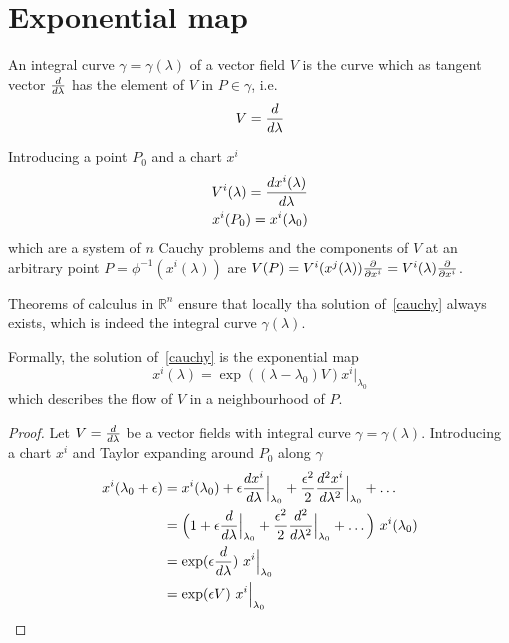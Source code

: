 \section{Exponential map}

    An integral curve $\gamma = \gamma(\lambda)$ of a vector field $V$ is the curve which as tangent vector $\frac{d}{d\lambda}$ has the element of $V$ in $P \in \gamma$, i.e. 
    \begin{equation*}
        V = \frac{d}{d\lambda}
    \end{equation*}

    Introducing a point $P_0$ and a chart $x^i$
    \begin{equation} \label{cauchy}
        \begin{split}
            V^i(\lambda) = \frac{dx^i(\lambda)}{d\lambda} \\
            x^i(P_0) = x^i(\lambda_0)
        \end{split}
    \end{equation}
    which are a system of $n$ Cauchy problems and the components of $V$ at an arbitrary point $ P = \phi^{-1}(x^i(\lambda))$ are $V(P) = V^i(x^j(\lambda)) \frac{\partial}{\partial x^i} = V^i(\lambda) \frac{\partial}{\partial x^i}$. 
    
    Theorems of calculus in $\mathbb R^n$ ensure that locally tha solution of~\eqref{cauchy} always exists, which is indeed the integral curve $\gamma(\lambda)$.

    Formally, the solution of~\eqref{cauchy} is the exponential map
    \begin{equation*}
        x^i(\lambda) = \exp((\lambda - \lambda_0)V) x^i \Big\vert_{\lambda_0}
    \end{equation*}
    which describes the flow of $V$ in a neighbourhood of $P$.

    \begin{proof}
        Let $V = \frac{d}{d\lambda}$ be a vector fields with integral curve $\gamma = \gamma (\lambda)$. Introducing a chart $x^i$ and Taylor expanding around $P_0$ along $\gamma$
        \begin{equation*}
        \begin{aligned}
            x^i(\lambda_0 + \epsilon) & = x^i(\lambda_0) + \epsilon \frac{dx^i}{d\lambda} \Big\vert_{\lambda_0} + \frac{\epsilon^2}{2} \frac{d^2x^i}{d\lambda^2} \Big\vert_{\lambda_0} + \ldots \\ & = \Big (1 + \epsilon \frac{d}{d\lambda} \Big\vert_{\lambda_0} + \frac{\epsilon^2}{2} \frac{d^2}{d\lambda^2} \Big\vert_{\lambda_0} + \ldots \Big) ~ x^i(\lambda_0) \\ & = \exp(\epsilon \frac{d}{d\lambda}) ~ x^i \Big\vert_{\lambda_0} \\ & = \exp(\epsilon V) ~ x^i \Big\vert_{\lambda_0} 
        \end{aligned}
        \end{equation*}
    \end{proof}
    
